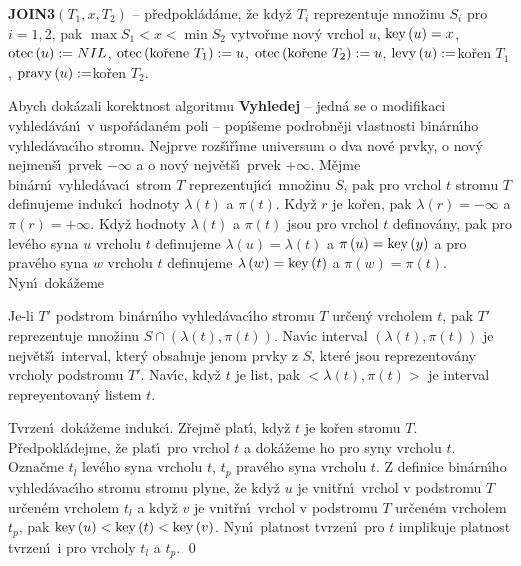 {\bf JOIN3$\left(T_1,x,T_2\right)$} -- p\v redpokl\'ad\'ame, \v ze kdy\v z $
T_i$ reprezentuje 
mno\v zinu $S_i$ pro $i=1,2$, pak $\max S_1<x<\min S_2$\newline 
vytvo\v rme nov\'y vrchol $u$, $\operatorname{key}\left(u\right)=x$, $\operatorname{otec}\left(u\right):=NIL$, \newline 
$\otec\left(\text{ko\v rene }T_1\right):=u$, $\otec\left(\text{ko\v rene }T_2\right):=u$, \newline 
$\operatorname{levy}\left(u\right):=$ko\v ren $T_1$, $\operatorname{pravy}\left(u\right):=$ko\v ren $T_2$.
\medskip


\flushpar Abych dok\'azali korektnost algoritmu {\bf Vyhledej} -- 
jedn\'a se o modifikaci vyhled\'av\'an\'\i\ v uspo\v r\'adan\'em poli --
pop\'\i\v seme po\-drobn\v eji vlastnosti bin\'arn\'\i ho vyhled\'avac\'\i ho 
stromu. Nej\-prve roz\v s\'\i \v r\'\i me universum o dva nov\'e prvky, o nov\'y 
nejmen\v s\'\i\ prvek $-\infty$ a o nov\'y nejv\v et\v s\'\i\ prvek $+\infty$. 
M\v ejme bin\'arn\'\i\ vyhled\'avac\'\i\ strom $T$ reprezentuj\'\i c\'\i\ 
mno\v zinu $S$, pak pro vrchol $t$ stromu $T$ definujeme indukc\'\i\ hodnoty $\lambda\left(t\right)$ 
a $\pi\left(t\right)$. Kdy\v z $r$ je ko\v ren, pak $\lambda\left(r\right)=-\infty$ a $\pi\left(r\right)=+\infty$. 
Kdy\v z hodnoty $\lambda\left(t\right)$ a $\pi\left(t\right)$ jsou pro vrchol $t$ definov\'any, pak pro lev\'eho syna $u$ vrcholu $t$ definujeme $\lambda\left(u\right)=\lambda\left(t\right)$ a $\pi\left(u\right)=\operatorname{key}\left(y\right)$
a pro prav\'eho syna $w$ vrcholu $t$ definujeme $\lambda\left(w\right)=\operatorname{key}\left(t\right)$ a $\pi\left(w\right)=\pi\left(t\right)$.
Nyn\'\i\ dok\'a\v zeme


Je-li $T'$ podstrom bin\'arn\'\i ho vyhled\'avac\'\i ho 
stromu $T$ ur\v cen\'y vrcholem $t$, pak $T'$ reprezentuje mno\v zinu 
$S\cap \left(\lambda \left(t\right),\pi \left(t\right)\right)$. Nav\'\i c interval $\left(\lambda \left(t\right),\pi 
\left(t\right)\right)$ je nejv\v et\v s\'\i\ interval, 
kter\'y obsahuje jenom prvky z $S$, kter\'e jsou reprezentov\'any 
vrcholy podstromu $T'$. Nav\'\i c, kdy\v z $t$ je list, pak $<\lambda\left(t\right),\pi\left(t\right)>$ je interval repreyentovan\'y listem $t$.
\endproclaim


Tvrzen\'\i\ dok\'a\v zeme indukc\'\i .  Z\v rejm\v e plat\'\i , 
kdy\v z $t$ je ko\v ren stromu $T$.  P\v redpokl\'adej\-me, \v ze plat\'\i\ pro vrchol 
$t$ a dok\'a\-\v ze\-me ho pro syny vrcholu $t$.  Ozna\v cme $t_l$ lev\'eho syna 
vrcholu $t$, $t_p$ prav\'eho syna vrcholu $t$.  Z definice bin\'arn\'\i ho 
vyhled\'avac\'\i ho stromu stromu plyne, \v ze kdy\v z $u$ je vnit\v rn\'\i\ 
vrchol v podstromu $T$ ur\v cen\'em vrcholem $t_l$ a kdy\v z $v$ je vnit\v rn\'\i\ 
vrchol v podstromu $T$ ur\v cen\'em vrcholem $t_p$, pak 
$\operatorname{key}\left(u\right)<\operatorname{key}\left(t\right)<\operatorname{key}\left(v\right)$.  Nyn\'\i\ platnost tvrzen\'\i\ pro $t$ 
implikuje platnost tvrzen\'\i\ i pro vrcholy $t_l$ a $t_p$.  \qed
\enddemo
\medskip

